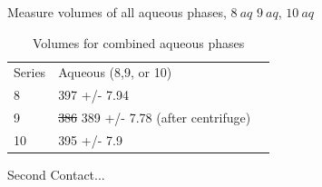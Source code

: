 \documentclass[idxtotoc,hyperref,openany,oneside]{labbook} %
\newcommand{\cmark}{\ding{51}}%
\newcommand{\done}{\rlap{$\square$}{\raisebox{2pt}{\large\hspace{1pt}\cmark}}%
  \hspace{-2.5pt}}
\begin{document}
\begin{todolist}
\item[\done]{Measure volumes of all aqueous phases, $\boxed{8\ aq}$
     $\boxed{9\ aq}$, $\boxed{10\ aq}$}
\begin{table}[H]
  \begin{center}
    \caption{Volumes for combined aqueous phases}
    \begin{tabular}{l l l}
      \toprule
      Series & Aqueous (8,9, or 10)\\ 
      8 & 397 +/- 7.94\\
      9 & \st{386} 389 +/- 7.78 (after centrifuge)\\
      10 & 395 +/- 7.9\\
      \bottomrule
    \end{tabular}
  \end{center}
\end{table}  
\end{todolist}

Second Contact...
\end{document}
